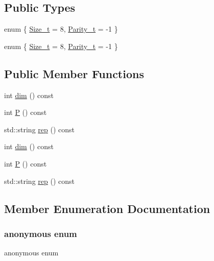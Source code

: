 \subsection*{Public Types}
\begin{DoxyCompactItemize}
\item 
enum \{ \mbox{\hyperlink{structHadron_1_1J7o2uRep_a1ecfa5f8aecb4c8b667c4a76e1461f51a59e3a77b2f3ffa11a44e2c09f4bf470b}{Size\+\_\+t}} = 8, 
\mbox{\hyperlink{structHadron_1_1J7o2uRep_a1ecfa5f8aecb4c8b667c4a76e1461f51ac72f57c047cb87e42079dd2653baa565}{Parity\+\_\+t}} = -\/1
 \}
\item 
enum \{ \mbox{\hyperlink{structHadron_1_1J7o2uRep_a1ecfa5f8aecb4c8b667c4a76e1461f51a59e3a77b2f3ffa11a44e2c09f4bf470b}{Size\+\_\+t}} = 8, 
\mbox{\hyperlink{structHadron_1_1J7o2uRep_a1ecfa5f8aecb4c8b667c4a76e1461f51ac72f57c047cb87e42079dd2653baa565}{Parity\+\_\+t}} = -\/1
 \}
\end{DoxyCompactItemize}
\subsection*{Public Member Functions}
\begin{DoxyCompactItemize}
\item 
int \mbox{\hyperlink{structHadron_1_1J7o2uRep_a3e4b64082feea60a18a0f73a6a8a17b2}{dim}} () const
\item 
int \mbox{\hyperlink{structHadron_1_1J7o2uRep_a88b8aa1e3c89050f1f0a901f0082b927}{P}} () const
\item 
std\+::string \mbox{\hyperlink{structHadron_1_1J7o2uRep_a49421513b527a11bd45ec02e4ad3a042}{rep}} () const
\item 
int \mbox{\hyperlink{structHadron_1_1J7o2uRep_a3e4b64082feea60a18a0f73a6a8a17b2}{dim}} () const
\item 
int \mbox{\hyperlink{structHadron_1_1J7o2uRep_a88b8aa1e3c89050f1f0a901f0082b927}{P}} () const
\item 
std\+::string \mbox{\hyperlink{structHadron_1_1J7o2uRep_a49421513b527a11bd45ec02e4ad3a042}{rep}} () const
\end{DoxyCompactItemize}


\subsection{Member Enumeration Documentation}
\mbox{\label{structHadron_1_1J7o2uRep_ac6f35807d90800577dd4da8293ec3057}} 
\subsubsection{\texorpdfstring{anonymous enum}{anonymous enum}}
{\footnotesize\ttfamily anonymous enum}


